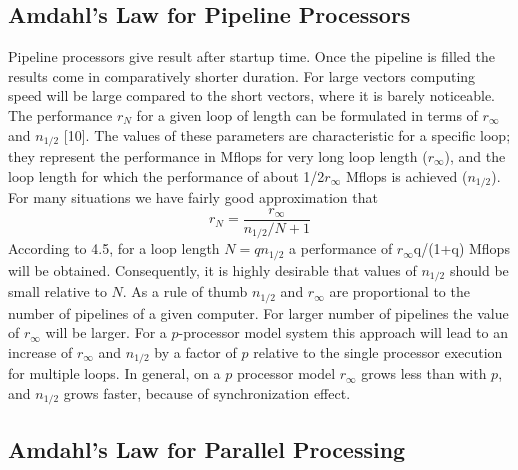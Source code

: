 \subsection{Amdahl's Law for Pipeline Processors}
Pipeline processors give result after startup time. Once the pipeline is filled the results come in comparatively shorter duration. For large vectors computing
speed will be large compared to the short vectors, where it is barely noticeable. The performance $r_{N}$ for a given loop of length can be formulated in
terms of $r_{\infty}$ and $n_{1/2}$ [10]. The values of these parameters are characteristic for a specific loop; they represent the performance in Mflops for
very long loop length ($r_{\infty}$), and the loop length for which the performance of about 1/2$r_{\infty}$ Mflops is achieved ($n_{1/2}$). For many
situations we have fairly good approximation that 
\begin{equation}
r_{N} = \frac{r_{\infty}}{n_{1/2}/N + 1}
\end{equation}
According to 4.5, for a loop length $N=qn_{1/2}$ a performance of $r_{\infty}$q/(1+q) Mflops will be obtained. Consequently, it is highly
desirable that values of $n_{1/2}$ should be small relative to $N$. As a rule of thumb $n_{1/2}$ and $r_{\infty}$ are proportional to
the number of pipelines of a given computer. For larger number of pipelines the value of $r_{\infty}$ will be larger. For a $p$-processor model system
this approach will lead to an increase of $r_{\infty}$ and $n_{1/2}$ by a factor of $p$ relative to the single processor execution for multiple loops. In
general, on a $p$ processor model $r_{\infty}$ grows less than with $p$, and $n_{1/2}$ grows faster, because of synchronization effect.

\subsection{Amdahl's Law for Parallel Processing}
